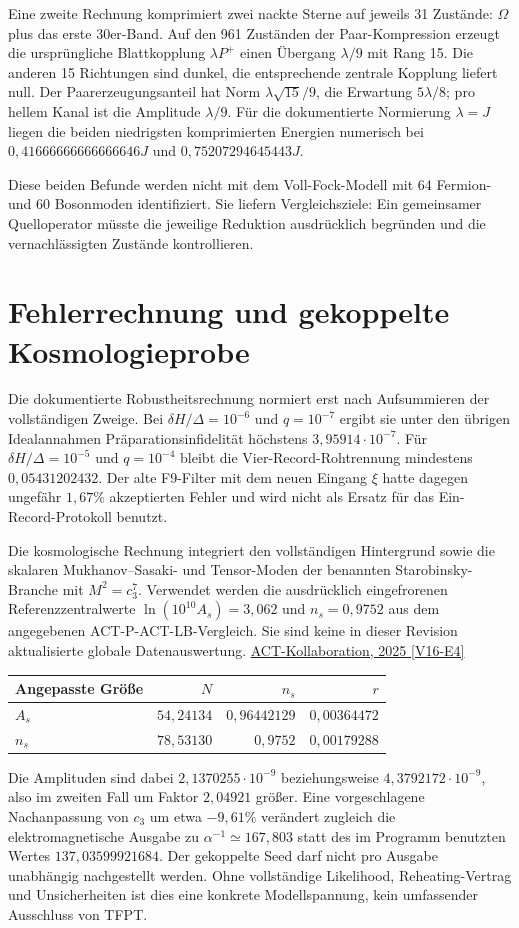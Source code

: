Eine zweite Rechnung komprimiert zwei nackte Sterne auf jeweils 31 Zustände: $\Omega$ plus das erste 30er-Band. Auf den 961 Zuständen der Paar-Kompression erzeugt die ursprüngliche Blattkopplung $\lambda P^+$ einen Übergang $\lambda/9$ mit Rang 15. Die anderen 15 Richtungen sind dunkel, die entsprechende zentrale Kopplung liefert null. Der Paarerzeugungsanteil hat Norm $\lambda\sqrt{15}/9$, die Erwartung $5\lambda/8$; pro hellem Kanal ist die Amplitude $\lambda/9$. Für die dokumentierte Normierung $\lambda=J$ liegen die beiden niedrigsten komprimierten Energien numerisch bei $0{,}41666666666666646J$ und $0{,}75207294645443J$.

Diese beiden Befunde werden nicht mit dem Voll-Fock-Modell mit 64 Fermion- und 60 Bosonmoden identifiziert. Sie liefern Vergleichsziele: Ein gemeinsamer Quelloperator müsste die jeweilige Reduktion ausdrücklich begründen und die vernachlässigten Zustände kontrollieren.

\section{Fehlerrechnung und gekoppelte Kosmologieprobe}
Die dokumentierte Robustheitsrechnung normiert erst nach Aufsummieren der vollständigen Zweige. Bei $\delta H/\Delta=10^{-6}$ und $q=10^{-7}$ ergibt sie unter den übrigen Idealannahmen Präparationsinfidelität höchstens $3{,}95914\cdot10^{-7}$. Für $\delta H/\Delta=10^{-5}$ und $q=10^{-4}$ bleibt die Vier-Record-Rohtrennung mindestens $0{,}05431202432$. Der alte F9-Filter mit dem neuen Eingang $\xi$ hatte dagegen ungefähr $1{,}67\%$ akzeptierten Fehler und wird nicht als Ersatz für das Ein-Record-Protokoll benutzt.

Die kosmologische Rechnung integriert den vollständigen Hintergrund sowie die skalaren Mukhanov--Sasaki- und Tensor-Moden der benannten Starobinsky-Branche mit $M^2=c_3^7$. Verwendet werden die ausdrücklich eingefrorenen Referenzzentralwerte $\ln(10^{10}A_s)=3{,}062$ und $n_s=0{,}9752$ aus dem angegebenen ACT-P-ACT-LB-Vergleich. Sie sind keine in dieser Revision aktualisierte globale Datenauswertung. \href{https://arxiv.org/abs/2503.14452}{ACT-Kollaboration, 2025 [V16-E4]}

\begin{center}
\begin{tabular}{lrrr}
\toprule
Angepasste Größe & $N$ & $n_s$ & $r$\\\midrule
$A_s$ & $54{,}24134$ & $0{,}96442129$ & $0{,}00364472$\\
$n_s$ & $78{,}53130$ & $0{,}9752$ & $0{,}00179288$\\\bottomrule
\end{tabular}
\end{center}
Die Amplituden sind dabei $2{,}1370255\cdot10^{-9}$ beziehungsweise $4{,}3792172\cdot10^{-9}$, also im zweiten Fall um Faktor $2{,}04921$ größer. Eine vorgeschlagene Nachanpassung von $c_3$ um etwa $-9{,}61\%$ verändert zugleich die elektromagnetische Ausgabe zu $\alpha^{-1}\simeq167{,}803$ statt des im Programm benutzten Wertes $137{,}03599921684$. Der gekoppelte Seed darf nicht pro Ausgabe unabhängig nachgestellt werden. Ohne vollständige Likelihood, Reheating-Vertrag und Unsicherheiten ist dies eine konkrete Modellspannung, kein umfassender Ausschluss von TFPT.
